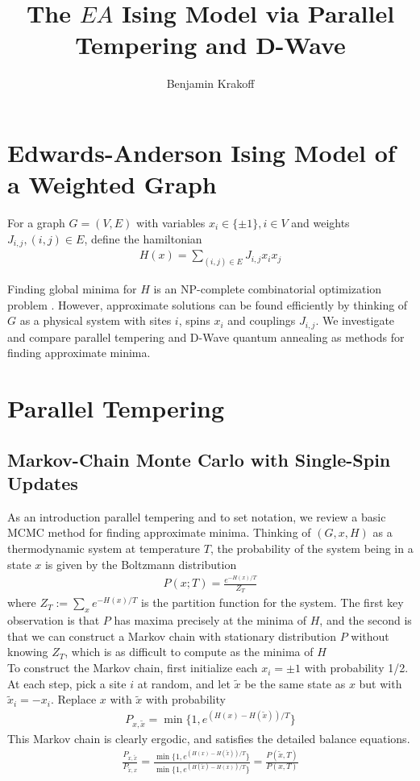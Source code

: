 \documentclass[12pt]{article}
\newcommand{\1}{\mathbf{1}}
\theoremstyle{remark}
\theoremstyle{definition}
\theoremstyle{proposition}
\theoremstyle{lemma}
\theoremstyle{definition}
\begin{document}
	\title{The $EA$ Ising Model via Parallel Tempering and D-Wave}
	\author{Benjamin Krakoff}
	\maketitle
	
	\section{Edwards-Anderson Ising Model of a Weighted Graph}
	\indent \indent For a graph $G = (V, E)$ with variables $x_i \in \{\pm1\}, i \in V$ and weights $J_{i, j}, (i, j) \in E$, define the hamiltonian
	\begin{align}
	H(x) = \sum_{(i, j) \in E} J_{i, j} x_ix_j
	\end{align}
	
	Finding global minima for $H$ is an NP-complete combinatorial optimization problem \cite{1982JPhA...15.3241B}. However, approximate solutions can be found efficiently by thinking of $G$ as a physical system with sites $i$, spins $x_i$ and couplings $J_{i, j}$. We investigate and compare parallel tempering and D-Wave quantum annealing as methods for finding approximate minima.
	
	\section{Parallel Tempering}
	\subsection{Markov-Chain Monte Carlo with Single-Spin Updates}
	\indent \indent As an introduction parallel tempering and to set notation, we review a basic MCMC method for finding approximate minima. Thinking of $(G, x, H)$ as a thermodynamic system at temperature $T$, the probability of the system being in a state $x$ is given by the Boltzmann distribution
	\begin{align}
	P(x; T) = \frac{e^{-H(x)/T}}{Z_T}
	\end{align}
	where $Z_T := \sum_{x} e^{-H(x)/T}$ is the partition function for the system. The first key observation is that $P$ has maxima precisely at the minima of $H$, and the second is that we can construct a Markov chain with stationary distribution $P$ without knowing $Z_T$, which is as difficult to compute as  the minima of $H$\\
	\indent To construct the Markov chain, first initialize each $x_i = \pm 1$ with probability 1/2. At each step, pick a site $i$ at random, and let $\tilde{x}$ be the same state as $x$ but with $\tilde{x}_i = -x_i$. Replace $x$ with $\tilde{x}$ with probability 
	\begin{align}
	P_{x, \tilde{x}} = \min\{1, e^{(H(x)- H(\tilde{x}))/T}\}
	\end{align}
	This Markov chain is clearly ergodic, and satisfies the detailed balance equations.
	\begin{align*}
		\frac{P_{x, \tilde{x}}}{P_{\tilde{x}, x}} = \frac{\min\{1, e^{(H(x)- H(\tilde{x}))/T}\}}{\min\{1, e^{(H(\tilde{x})- H(x))/T}\}} = \frac{P(\tilde{x}, T)}{P(x, T)}
		\end{align*}
	
\end{document}
